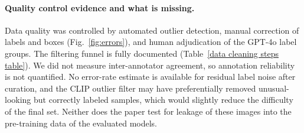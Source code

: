\documentclass[sigconf, nonacm]{acmart}
\begin{document}
\begin{table}[t]
  \centering
  \caption{Distribution metrics of FoodLogAthl-218 and UEC-Food 256 under three feature extractors. Higher Trace and Davies--Bouldin indicate larger spread; lower Silhouette and Calinski--Harabasz indicate less compact clusters. Bold marks the value indicating the more spread, less compact dataset.}
  \label{table:diversity_metrics_comparison}
\end{table}

\paragraph{Quality control evidence and what is missing.} Data quality was controlled by automated outlier detection, manual correction of labels and boxes (Fig.~\ref{fig:errors}), and human adjudication of the GPT-4o label groups. The filtering funnel is fully documented (Table~\ref{data cleaning steps table}). We did not measure inter-annotator agreement, so annotation reliability is not quantified. No error-rate estimate is available for residual label noise after curation, and the CLIP outlier filter may have preferentially removed unusual-looking but correctly labeled samples, which would slightly reduce the difficulty of the final set. Neither does the paper test for leakage of these images into the pre-training data of the evaluated models.
\end{document}
